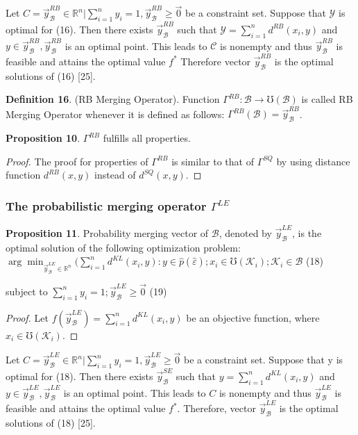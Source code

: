 \documentclass[]{iosart2c}
\begin{document}
    Let $C = { \vec{y}^{RB}_\mathcal{B} \in \mathbb{R}^n|\sum^n_{i=1} y_i = 1, \vec{y}^{RB}_\mathcal{B} \geq \vec{0} }$ be
    a constraint set. Suppose that $\mathcal{Y}$ is optimal for (16).
    Then there exists $\vec{y}^{RB}_\mathcal{B}$ such that $\mathcal{Y} = \sum^n_{i=1} d^{RB}(x_i, y)$
    and $y \in \vec{y}^{RB}_\mathcal{B} , \vec{y}^{RB}_\mathcal{B}$ is an optimal point. This leads to $\mathcal{C}$
    is nonempty and thus $\vec{y}^{RB}_\mathcal{B}$ is feasible and attains the
    optimal value $f^*$ Therefore vector $\vec{y}^{RB}_\mathcal{B}$ is the optimal
    solutions of (16) [25].

    \textbf{Definition 16}. (RB Merging Operator). Function
    $\Gamma^{RB} : \mathcal{B} \to \mho(\mathcal{B})$ is called RB Merging Operator
    whenever it is defined as follows: $\Gamma^{RB}(\mathcal{B}) = \vec{y}^{RB}_\mathcal{B}$.

    \textbf{Proposition 10}. $\Gamma^{RB}$ fulfills all properties.

    \begin{proof}
        The proof for properties of $\Gamma^{RB}$ is similar
        to that of $\Gamma^{SQ}$ by using distance function $d^{RB}(x, y)$
        instead of $d^{SQ}(x, y)$.
    \end{proof}

    \subsubsection{The probabilistic merging operator $\Gamma^{LE}$}

    \textbf{Proposition 11}. Probability merging vector of $\mathcal{B}$,
    denoted by $\vec{y}^{LE}_\mathcal{B}$, is the optimal solution of the following optimization problem:
    $\arg \min_{\vec{y}^{LE}_\mathcal{B} \in \mathbb{R}^n} (\sum^n_{i=1} d^{KL}(x_i, y) :
    y \in \hat{p}(\hat{\varepsilon}); x_i \in \mho(\mathcal{K}_i);\mathcal{K}_i \in \mathcal{B}$ (18)

    subject to $\sum^n_{i=1} y_i = 1; \vec{y}^{LE}_\mathcal{B} \geq \vec{0}$ (19)

    \begin{proof}
        Let $f(\vec{y}^{LE}_\mathcal{B} ) = \sum^n_{i=1} d^{KL}(x_i, y)$ be an objective function, where $x_i \in \mho(\mathcal{K}_i)$.
    \end{proof}

    Let $C = {\vec{y}^{LE}_\mathcal{B} \in \mathbb{R}^n|\sum^n_{i=1} y_i = 1, \vec{y}^{LE}_\mathcal{B} \geq \vec{0} }$ be a
    constraint set. Suppose that y is optimal for (18).
    Then there exists $\vec{y}^{SE}_\mathcal{B}$ such that $y = \sum^n_{i=1} d^{KL}(x_i, y)$
    and $y \in \vec{y}^{LE}_\mathcal{B} , \vec{y}^{LE}_\mathcal{B}$ is an optimal point. This leads to
    $C$ is nonempty and thus $\vec{y}^{LE}_\mathcal{B}$ is feasible and attains
    the optimal value $f^*$. Therefore, vector $\vec{y}^{LE}_\mathcal{B}$ is the
    optimal solutions of (18) [25].
\end{document}
